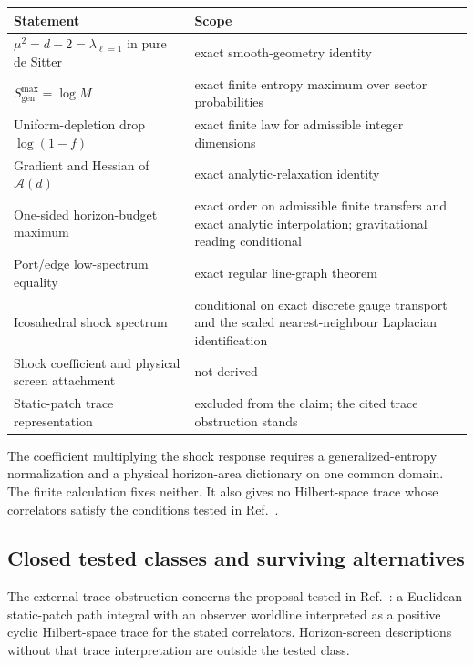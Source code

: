 \documentclass[11pt]{article}
\theoremstyle{remark}
\begin{document}
\begin{center}
\begin{tabular}{@{}p{}p{}@{}}
\toprule
Statement & Scope \\
\midrule
\(\mu^2=d-2=\lambda_{\ell=1}\) in pure de Sitter &
exact smooth-geometry identity \\
\(S_{\mathrm{gen}}^{\max}=\log M\) &
exact finite entropy maximum over sector probabilities \\
Uniform-depletion drop \(\log(1-f)\) &
exact finite law for admissible integer dimensions \\
Gradient and Hessian of \(\mathcal A(d)\) &
exact analytic-relaxation identity \\
One-sided horizon-budget maximum &
exact order on admissible finite transfers and exact analytic interpolation;
gravitational reading conditional \\
Port/edge low-spectrum equality &
exact regular line-graph theorem \\
Icosahedral shock spectrum &
conditional on exact discrete gauge transport and the scaled
nearest-neighbour Laplacian identification \\
Shock coefficient and physical screen attachment &
not derived \\
Static-patch trace representation &
excluded from the claim; the cited trace obstruction stands \\
\bottomrule
\end{tabular}
\end{center}

The coefficient multiplying the shock response requires a generalized-entropy
normalization and a physical horizon-area dictionary on one common domain.
The finite calculation fixes neither. It also gives no Hilbert-space trace
whose correlators satisfy the conditions tested in
Ref.~\cite{chenStanfordTangYang2026}.

\subsection*{Closed tested classes and surviving alternatives}

The external trace obstruction concerns the proposal tested in
Ref.~\cite{chenStanfordTangYang2026}: a Euclidean static-patch path integral
with an observer worldline interpreted as a positive cyclic Hilbert-space
trace for the stated correlators. Horizon-screen descriptions without that
trace interpretation are outside the tested class.
\end{document}
